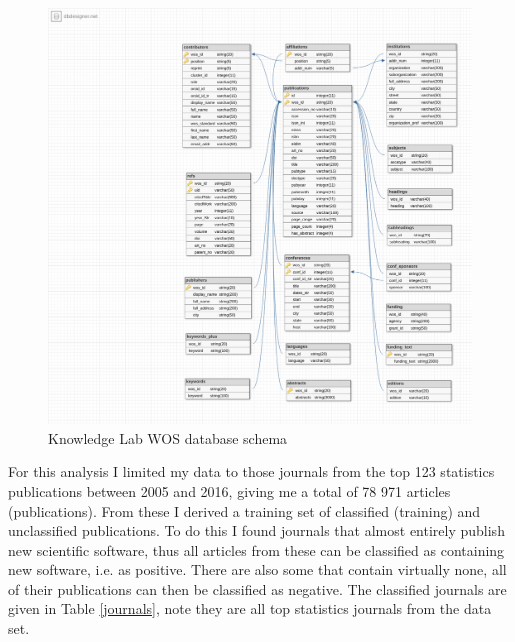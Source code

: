 \documentclass[12pt, a4paper]{article}
\begin{document}
\begin{figure}[H]
	\centering
	\includegraphics[width=\textwidth]{wos2_schema}
	\caption{Knowledge Lab WOS database schema}\label{schema}
\end{figure}
\newpage
For this analysis I limited my data to those journals from the top 123 statistics publications between 2005 and 2016, giving me a total of 78 971 articles (publications). From these I derived a training set of classified (training) and unclassified publications. To do this I found journals that almost entirely publish new scientific software, thus all articles from these can be classified as containing new software, i.e. as positive. There are also some that contain virtually none, all of their publications can then be classified as negative.  The classified journals are given in Table \ref{journals}, note they are all top statistics journals from the data set.
\end{document}
